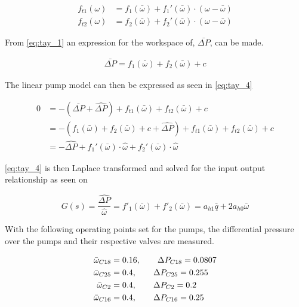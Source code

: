 \begin{equation}
\begin{split}
f_{t1}(\omega) &= f_1(\bar{\omega}) + f_1'(\bar{\omega})\cdot(\omega - \bar{\omega}) \\
f_{t2}(\omega) &= f_2(\bar{\omega}) + f_2'(\bar{\omega})\cdot(\omega - \bar{\omega})
\end{split}
\label{eq:tay_2}
\end{equation}

From \eqref{eq:tay_1} an expression for the workspace of, $\bar{\Delta P}$, can be made.

\begin{equation}
\begin{split}
\bar{\Delta P} = f_{1}(\bar{\omega}) + f_{2}(\bar{\omega}) + c
\end{split}
\label{eq:tay_3}
\end{equation}

The linear pump model can then be expressed as seen in \eqref{eq:tay_4}

\begin{equation}
\begin{split}
0 &= -(\bar{\Delta P} + \hat{\Delta P}) + f_{t1}(\bar{\omega}) + f_{t2}(\bar{\omega}) + c\\
  &= -(f_{1}(\bar{\omega}) + f_{2}(\bar{\omega}) + c + \hat{\Delta P}) + f_{t1}(\bar{\omega}) + f_{t2}(\bar{\omega}) + c \\ 
  &= -\hat{\Delta P} + f_1'(\bar{\omega})\cdot\hat{\omega} + f_2'(\bar{\omega})\cdot\hat{\omega}
\end{split}
\label{eq:tay_4}
\end{equation}

\eqref{eq:tay_4} is then Laplace transformed and solved for the input output relationship as seen on 

\begin{equation}
G(s) = \frac{\hat{\Delta P}}{\hat{\omega}} = f'_1(\bar{\omega}) + f'_2(\bar{\omega}) = a_{h1}\bar{q} + 2a_{h0}\bar{\omega}
\label{eq:lin_pump_simon}
\end{equation}

With the following operating points set for the pumps, the differential pressure over the pumps and their respective valves are measured. 

\begin{equation}
\centering
	\begin{split}
	\bar{\omega}_{C18} &= 0.16,\hspace{20pt} \Delta P_{C18} = 0.0807 \\
	\bar{\omega}_{C25} &= 0.4,\hspace{20pt} \Delta P_{C25} = 0.255  \\
	\bar{\omega}_{C2}  &= 0.4,\hspace{20pt} \Delta P_{C2} = 0.2 \\
	\bar{\omega}_{C16} &= 0.4,\hspace{20pt} \Delta P_{C16} =0.25 
	\end{split}
\end{equation}

